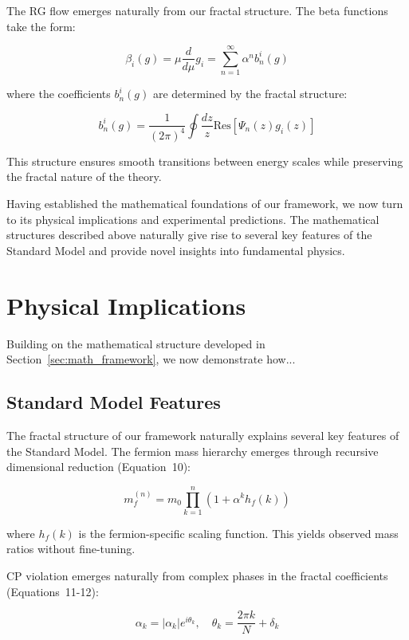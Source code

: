 \documentclass[12pt]{article}
\begin{document}
The RG flow emerges naturally from our fractal structure. The beta functions take the form:

\[
\beta_i(g) = \mu\frac{d}{d\mu}g_i = \sum_{n=1}^{\infty} \alpha^n b_n^i(g)
\]

where the coefficients $b_n^i(g)$ are determined by the fractal structure:

\[
b_n^i(g) = \frac{1}{(2\pi)^4}\oint \frac{dz}{z} \text{Res}\left[\Psi_n(z)g_i(z)\right]
\]

This structure ensures smooth transitions between energy scales while preserving the fractal nature of the theory.

Having established the mathematical foundations of our framework, we now turn to its physical implications and experimental predictions. The mathematical structures described above naturally give rise to several key features of the Standard Model and provide novel insights into fundamental physics.

\section{Physical Implications}

\label{sec:physical_implications}

Building on the mathematical structure developed in Section~\ref{sec:math_framework}, we now demonstrate how...

\subsection{Standard Model Features}

The fractal structure of our framework naturally explains several key features of the Standard Model. The fermion mass hierarchy emerges through recursive dimensional reduction (Equation~10):

\begin{equation}
m_f^{(n)} = m_0 \prod_{k=1}^n \left(1 + \alpha^k h_f(k)\right)
\end{equation}

where $h_f(k)$ is the fermion-specific scaling function. This yields observed mass ratios without fine-tuning.

CP violation emerges naturally from complex phases in the fractal coefficients (Equations~11-12):

\begin{equation}
\alpha_k = |\alpha_k|e^{i\theta_k}, \quad \theta_k = \frac{2\pi k}{N} + \delta_k
\end{equation}
\end{document}
